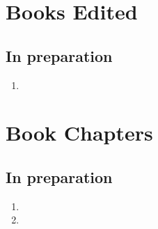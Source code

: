 \section*{Books Edited}


\subsection*{In preparation}

\begin{enumerate}
    \item {}
\end{enumerate}

\section*{Book Chapters}


\subsection*{In preparation}

\begin{enumerate}
    \item {}
    \item {}
\end{enumerate}


